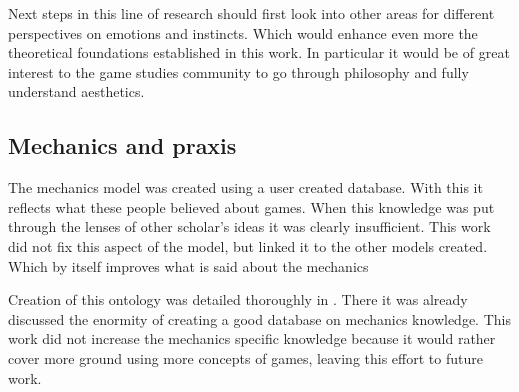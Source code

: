 Next steps in this line of research should first look into other areas for different perspectives on emotions and instincts. Which would enhance even more the theoretical foundations established in this work. In particular it would be of great interest to the game studies community to go through philosophy and fully understand aesthetics.

\subsection{Mechanics and praxis}

The mechanics model was created using a user created database. With this it reflects what these people believed about games. When this knowledge was put through the lenses of other scholar's ideas it was clearly insufficient. This work did not fix this aspect of the model, but linked it to the other models created. Which by itself improves what is said about the mechanics

Creation of this ontology was detailed thoroughly in \cite{kritz_buildingOntology}. There it was already discussed the enormity of creating a good database on mechanics knowledge. This work did not increase the mechanics specific knowledge because it would rather cover more ground using more concepts of games, leaving this effort to future work.

